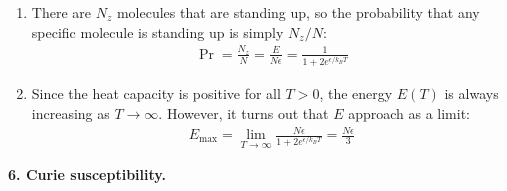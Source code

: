 \documentclass{article}
\theoremstyle{definition}
\newcommand{\f}[2]{\frac{#1}{#2}}
\begin{document}
\begin{enumerate}[label=(\alph*)]
	\item There are $N_z$ molecules that are standing up, so the probability that any specific molecule is standing up is simply $N_z/N$:
	\begin{align*}
	\boxed{\Pr = \f{N_z}{N}  =\f{E}{N\epsilon} = \f{1}{1 + 2e^{\epsilon/k_BT}}}
	\end{align*}
	
	\item Since the heat capacity is positive for all $T>0$, the energy $E(T)$ is always increasing as $T\to \infty$. However, it turns out that $E$ approach as a limit:
	\begin{align*}
	\boxed{E_\text{max} = \lim_{T\to \infty} \f{N\epsilon}{1 + 2e^{\epsilon/k_BT}} = \f{N\epsilon}{3}}
	\end{align*}
\end{enumerate}




\noindent \textbf{6. Curie susceptibility.}
\end{document}
